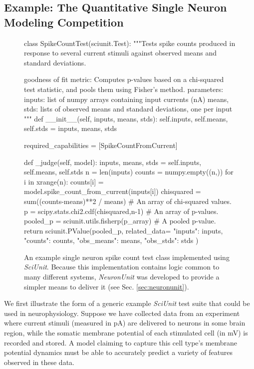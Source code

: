 \documentclass[9pt]{sig-alternate}
\begin{document}
\subsection{Example: The Quantitative Single Neuron Modeling Competition}
\begin{figure}
\small
\begin{python}
class SpikeCountTest(sciunit.Test):
  """Tests spike counts produced in response to several current stimuli against observed means and standard deviations. 

  goodness of fit metric: Computes p-values based on a chi-squared test statistic, and pools them using Fisher's method.
  parameters:
    inputs: list of numpy arrays containing input currents (nA)
    means, stds: lists of observed means and standard deviations, one per input
  """
  def __init__(self, inputs, means, stds):
    self.inputs, self.means, self.stds = inputs, means, stds
	
  required_capabilities = [SpikeCountFromCurrent]
	
  def _judge(self, model):
    inputs, means, stds = self.inputs, self.means, self.stds
    n = len(inputs)
    counts = numpy.empty((n,))
    for i in xrange(n):
      counts[i] = model.spike_count_from_current(inputs[i])
    chisquared = sum((counts-means)**2 / means) # An array of chi-squared values.  
    p = scipy.stats.chi2.cdf(chisquared,n-1) # An array of p-values.  
    pooled_p = sciunit.utils.fisherp(p_array) # A pooled p-value.  
    return sciunit.PValue(pooled_p, related_data={
      "inputs": inputs, "counts": counts, "obs_means": means, "obs_stds": stds
    })
\end{python}
\vspace{-5px}
\caption{An example single neuron spike count test class implemented using \textit{SciUnit}. Because this implementation contains logic common to many different systems, \textit{NeuronUnit} was developed to provide a simpler means to deliver it (see Sec. \ref{sec:neuronunit}).}
\label{fig:rate_test}
\vspace{-15px}
\end{figure}

We first illustrate the form of a generic example \textit{SciUnit} test suite that could be used in neurophysiology. 
Suppose we have collected data from an experiment where current stimuli (measured in pA) are delivered to neurons in some brain region, while the somatic membrane potential of each stimulated cell (in mV) is recorded and stored.  
A model claiming to capture this cell type's membrane potential dynamics must be able to accurately predict a variety of features observed in these data.
\end{document}
